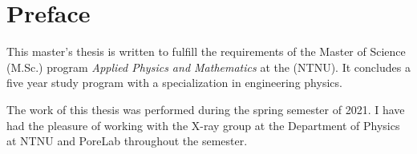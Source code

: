 \chapter*{Preface}
This master's thesis is written to fulfill the requirements of the Master of Science (M.Sc.) program \textit{Applied Physics and Mathematics} at the \NTNU (NTNU). It concludes a five year study program with a specialization in engineering physics. 

The work of this thesis was performed during the spring semester of 2021. I have had the pleasure of working with the X-ray group at the Department of Physics at NTNU and PoreLab throughout the semester. 

